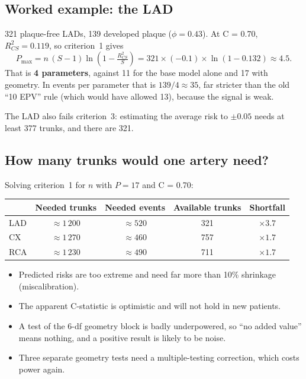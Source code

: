 \documentclass[11pt,a4paper]{article}
\begin{document}
\subsection*{Worked example: the LAD}

321 plaque-free LADs, 139 developed plaque ($\phi = 0.43$). At C = 0.70, $R^2_{CS} = 0.119$, so
criterion~1 gives
\[
  P_{\max} = n\,(S-1)\ln\!\left(1-\tfrac{R^2_{CS}}{S}\right)
           = 321 \times (-0.1) \times \ln(1 - 0.132) \approx 4.5 .
\]
That is \textbf{4 parameters}, against 11 for the base model alone and 17 with geometry. In events
per parameter that is $139/4 \approx 35$, far stricter than the old ``10 EPV'' rule (which would
have allowed 13), because the signal is weak.

The LAD also fails criterion~3: estimating the average risk to $\pm 0.05$ needs at least
377 trunks, and there are 321.

\subsection*{How many trunks would one artery need?}

Solving criterion~1 for $n$ with $P = 17$ and C = 0.70:

\begin{center}
\begin{tabular}{lcccc}
\toprule
 & Needed trunks & Needed events & Available trunks & Shortfall \\
\midrule
LAD & $\approx 1\,200$ & $\approx 520$ &   321 & $\times 3.7$ \\
CX  & $\approx 1\,270$ & $\approx 460$ &   757 & $\times 1.7$ \\
RCA & $\approx 1\,230$ & $\approx 490$ &   711 & $\times 1.7$ \\
\bottomrule
\end{tabular}
\end{center}

\begin{warnbox}
\begin{itemize}\setlength\itemsep{2pt}
  \item Predicted risks are too extreme and need far more than 10\% shrinkage (miscalibration).
  \item The apparent C-statistic is optimistic and will not hold in new patients.
  \item A test of the 6-df geometry block is badly underpowered, so ``no added value'' means
        nothing, and a positive result is likely to be noise.
  \item Three separate geometry tests need a multiple-testing correction, which costs power again.
\end{itemize}
\end{warnbox}
\end{document}
